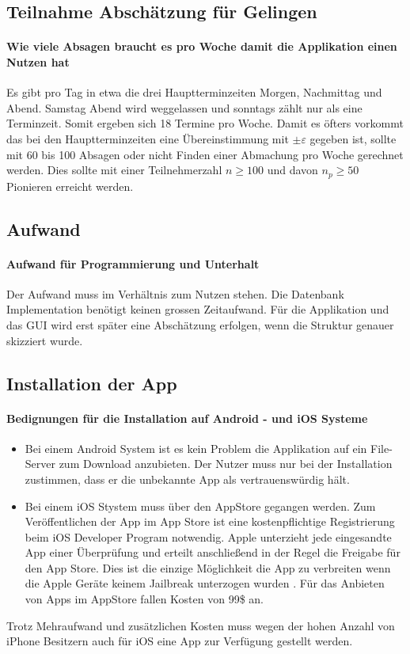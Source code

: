 \subsection{Teilnahme Abschätzung für Gelingen}
\paragraph{Wie viele Absagen braucht es pro Woche damit die Applikation einen Nutzen hat} Es gibt pro Tag in etwa die drei Hauptterminzeiten Morgen, Nachmittag und Abend. Samstag Abend wird weggelassen und sonntags zählt nur als eine Terminzeit. Somit ergeben sich 18 Termine pro Woche. Damit es öfters vorkommt das bei den Hauptterminzeiten eine Übereinstimmung mit $\pm\varepsilon$ gegeben ist, sollte mit 60 bis 100 Absagen oder nicht Finden einer Abmachung pro Woche gerechnet werden. Dies sollte mit einer Teilnehmerzahl $n \geqslant 100$ und davon $n_p \geqslant 50$ Pionieren erreicht werden.

\subsection{Aufwand}
\paragraph{Aufwand für Programmierung und Unterhalt} Der Aufwand muss im Verhältnis zum Nutzen stehen. Die Datenbank Implementation benötigt keinen grossen Zeitaufwand. Für die Applikation und das GUI wird erst später eine Abschätzung erfolgen, wenn die Struktur genauer skizziert wurde.

\subsection{Installation der App}
\paragraph{Bedignungen für die Installation auf Android - und iOS Systeme}
\begin{itemize}
\item Bei einem Android System ist es kein Problem die Applikation auf ein File-Server zum Download anzubieten. Der Nutzer muss nur bei der Installation zustimmen, dass er die unbekannte App als vertrauenswürdig hält.
\item Bei einem iOS Stystem muss über den AppStore gegangen werden.  Zum Veröffentlichen der App im App Store ist eine kostenpflichtige Registrierung beim iOS Developer Program notwendig. Apple unterzieht jede eingesandte App einer Überprüfung und erteilt anschließend in der Regel die Freigabe für den App Store. Dies ist die einzige Möglichkeit die App zu verbreiten wenn die Apple Geräte keinem Jailbreak unterzogen wurden \cite{appStore}. Für das Anbieten von Apps im AppStore fallen Kosten von 99\$ an.
\end{itemize}
Trotz Mehraufwand und zusätzlichen Kosten muss wegen der hohen Anzahl von iPhone Besitzern auch für iOS eine App zur Verfügung gestellt werden.

